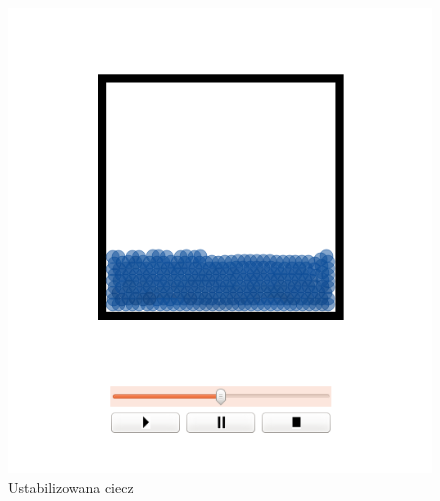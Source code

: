 \begin{minipage}{0.5\textwidth}
\begin{figure}[H]
 \begin{center} 
  \includegraphics[width=\textwidth]{./rysunki/plasko_stabilny} 
 \end{center}
 \caption{Ustabilizowana ciecz}
 \label{fig:plasko_stabilny} 
\end{figure}
\end{minipage}\\[0.1cm]

